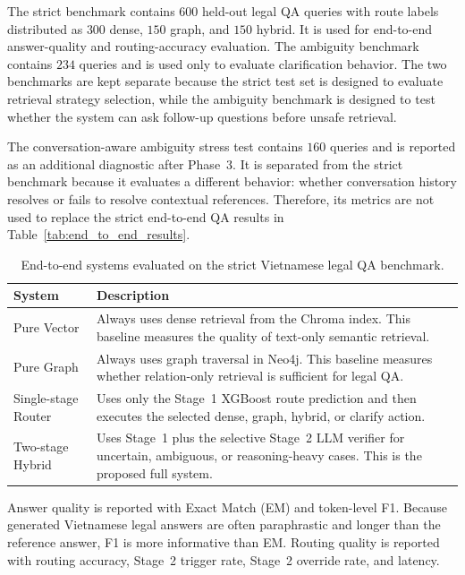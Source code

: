 \documentclass[11pt,twocolumn]{article}
\begin{document}
The strict benchmark contains $600$ held-out legal QA queries
with route labels distributed as $300$ dense, $150$ graph,
and $150$ hybrid. It is used for end-to-end answer-quality
and routing-accuracy evaluation. The ambiguity benchmark
contains $234$ queries and is used only to evaluate
clarification behavior. The two benchmarks are kept separate
because the strict test set is designed to evaluate retrieval
strategy selection, while the ambiguity benchmark is designed
to test whether the system can ask follow-up questions before
unsafe retrieval.

The conversation-aware ambiguity stress test contains $160$
queries and is reported as an additional diagnostic after
Phase~3. It is separated from the strict benchmark because it
evaluates a different behavior: whether conversation history
resolves or fails to resolve contextual references. Therefore,
its metrics are not used to replace the strict end-to-end QA
results in Table~\ref{tab:end_to_end_results}.

\begin{table}[!htbp]
\centering
\caption{End-to-end systems evaluated on the strict Vietnamese legal QA benchmark.}
\label{tab:evaluated_systems}
\scriptsize
\setlength{\tabcolsep}{2.4pt}
\renewcommand{\arraystretch}{1.08}
\begin{tabularx}{\columnwidth}{L{2.65cm}Y}
\toprule
\textbf{System} & \textbf{Description} \\
\midrule
Pure Vector &
Always uses dense retrieval from the Chroma index. This
baseline measures the quality of text-only semantic retrieval. \\
Pure Graph &
Always uses graph traversal in Neo4j. This baseline measures
whether relation-only retrieval is sufficient for legal QA. \\
Single-stage Router &
Uses only the Stage~1 XGBoost route prediction and then
executes the selected dense, graph, hybrid, or clarify action. \\
Two-stage Hybrid &
Uses Stage~1 plus the selective Stage~2 LLM verifier for
uncertain, ambiguous, or reasoning-heavy cases. This is the
proposed full system. \\
\bottomrule
\end{tabularx}
\end{table}

Answer quality is reported with Exact Match (EM) and
token-level F1. Because generated Vietnamese legal answers
are often paraphrastic and longer than the reference answer,
F1 is more informative than EM. Routing quality is reported
with routing accuracy, Stage~2 trigger rate, Stage~2 override
rate, and latency.
\end{document}

